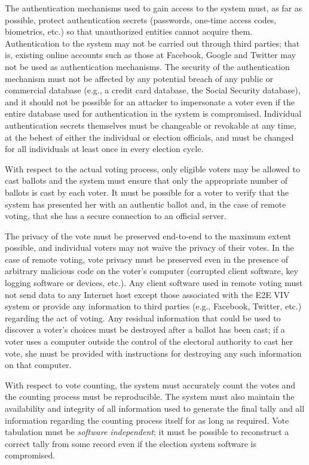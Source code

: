 The authentication mechanisms used to gain access to the system must,
as far as possible, protect authentication secrets (passwords,
one-time access codes, biometrics, etc.) so that unauthorized entities
cannot acquire them. Authentication to the system may not be carried
out through third parties; that is, existing online accounts such as
those at Facebook, Google and Twitter may not be used as
authentication mechanisms. The security of the authentication
mechanism must not be affected by any potential breach of any public
or commercial database (e.g., a credit card database, the Social
Security database), and it should not be possible for an attacker to
impersonate a voter even if the entire database used for
authentication in the system is compromised. Individual authentication
secrets themselves must be changeable or revokable at any time, at the
behest of either the individual or election officials, and must be
changed for all individuals at least once in every election cycle.

With respect to the actual voting process, only eligible voters may be
allowed to cast ballots and the system must ensure that only the
appropriate number of ballots is cast by each voter. It must be
possible for a voter to verify that the system has presented her with
an authentic ballot and, in the case of remote voting, that she has a
secure connection to an official server. 

The privacy of the vote must be preserved end-to-end to the maximum
extent possible, and individual voters may not waive the privacy of
their votes. In the case of remote voting, vote privacy must be
preserved even in the presence of arbitrary malicious code on the
voter's computer (corrupted client software, key logging software or
devices, etc.). Any client software used in remote voting must not
send data to any Internet host except those associated with the E2E
VIV system or provide any information to third parties (e.g.,
Facebook, Twitter, etc.) regarding the act of voting. Any residual
information that could be used to discover a voter's choices must be
destroyed after a ballot has been cast; if a voter uses a computer
outside the control of the electoral authority to cast her vote, she
must be provided with instructions for destroying any such information
on that computer.

With respect to vote counting, the system must accurately count the
votes and the counting process must be reproducible. The system must
also maintain the availability and integrity of all information used
to generate the final tally and all information regarding the counting
process itself for as long as required. Vote tabulation must be
\emph{software independent}; it must be possible to reconstruct a
correct tally from some record even if the election system software is
compromised.

